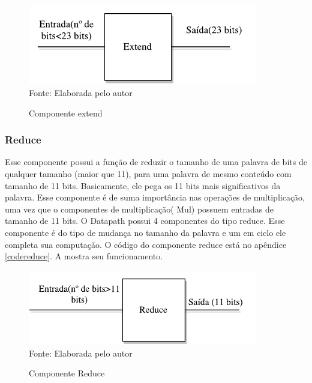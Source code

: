 \begin{figure}[H]
	\centering
	\caption{Componente extend}
	\includegraphics[width=10cm]{figures/Extend.pdf}\\
	
	{Fonte: Elaborada pelo autor}
	\label{extend}
\end{figure}


\subsubsection{Reduce}
Esse componente possui a função de reduzir o tamanho de uma palavra de bits de qualquer tamanho (maior que 11), para uma palavra de mesmo conteúdo com tamanho de 11 bits. Basicamente, ele pega os 11 bits mais significativos da palavra. Esse componente é de suma importância nas operações de multiplicação, uma vez que o componentes de multiplicação( Mul) possuem entradas de tamanho de 11 bits. O Datapath possui 4 componentes do tipo reduce. Esse componente é do tipo de mudança no tamanho da palavra e um em ciclo ele completa sua computação. O código do componente reduce está no apêndice \ref{codereduce}. A  mostra seu funcionamento.


\begin{figure}[H]
	\centering
	\caption{Componente Reduce}
	\includegraphics[width=10cm]{figures/Reduce.pdf}\\
	
	{Fonte: Elaborada pelo autor}
	\label{reduce}
\end{figure}


